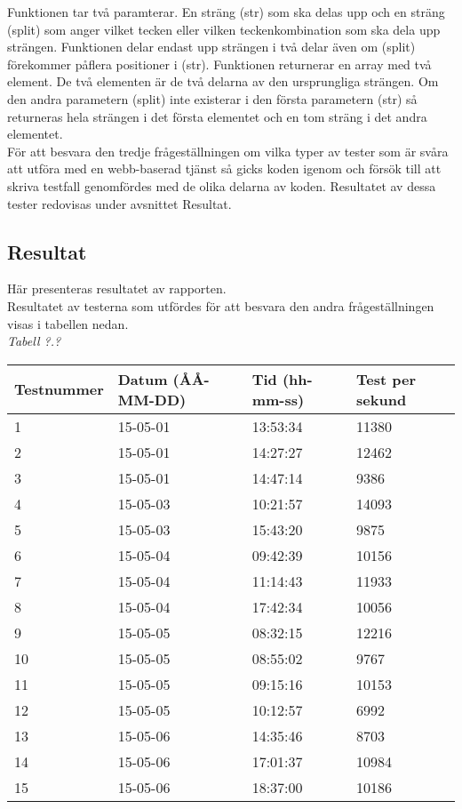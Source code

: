 Funktionen tar två paramterar. En sträng (str) som ska delas upp och 
en sträng (split) som anger vilket tecken eller vilken teckenkombination
som ska dela upp strängen. Funktionen delar endast upp strängen i två delar
även om (split) förekommer påflera positioner i (str). Funktionen returnerar 
en array med två element.
De två elementen är de två delarna av den ursprungliga strängen. Om den andra
parametern (split) inte existerar i den första parametern (str) så returneras
hela strängen i det första elementet och en tom sträng i det andra elementet.\\

För att besvara den tredje frågeställningen om vilka typer av tester som är 
svåra att utföra med en webb-baserad tjänst så gicks koden igenom och 
försök till att skriva testfall genomfördes
med de olika delarna av koden. Resultatet av dessa tester redovisas under 
avsnittet Resultat.

\subsection{Resultat}
Här presenteras resultatet av rapporten.\\

Resultatet av testerna som utfördes för att besvara den andra frågeställningen
visas i tabellen nedan.\\

\noindent\emph{Tabell ?.?}
\begin{center}
  \begin{tabular}{| l | l | l | l |}
  \hline
  Testnummer & Datum (ÅÅ-MM-DD) & Tid (hh-mm-ss) & Test per sekund\\ \hline
  1 & 15-05-01 & 13:53:34 & 11380\\ \hline
  2 & 15-05-01 & 14:27:27 & 12462\\ \hline
  3 & 15-05-01 & 14:47:14 & 9386\\ \hline 
  4 & 15-05-03 & 10:21:57 & 14093\\ \hline 
  5 & 15-05-03 & 15:43:20 & 9875\\ \hline 
  6 & 15-05-04 & 09:42:39 & 10156\\ \hline 
  7 & 15-05-04 & 11:14:43 & 11933\\ \hline 
  8 & 15-05-04 & 17:42:34 & 10056\\ \hline 
  9 & 15-05-05 & 08:32:15 & 12216\\ \hline 
  10 & 15-05-05 & 08:55:02 & 9767\\ \hline 
  11 & 15-05-05 & 09:15:16 & 10153\\ \hline 
  12 & 15-05-05 & 10:12:57 & 6992\\ \hline 
  13 & 15-05-06 & 14:35:46 & 8703\\ \hline 
  14 & 15-05-06 & 17:01:37 & 10984\\ \hline 
  15 & 15-05-06 & 18:37:00 & 10186\\ \hline 
  \end{tabular}
\end{center}

